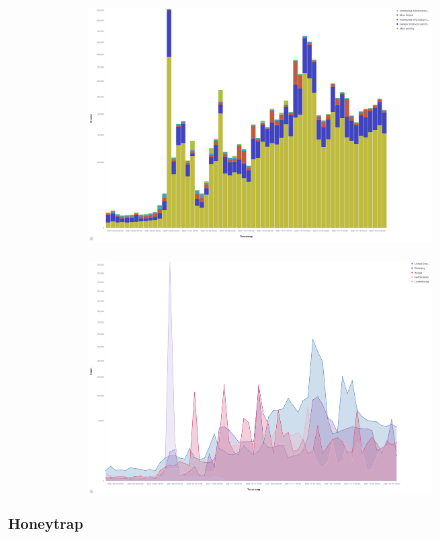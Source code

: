 \begin{figure}
    \centering
   
    \begin{subfigure}[b]{0.49\textwidth}
        \centering
        \includegraphics[width=\textwidth]{figures/tpot-suricata-attacks.png}
        \caption{}
        \label{fig:tpot-suricata-attacks}
    \end{subfigure}
    \hfill
    \begin{subfigure}[b]{0.49\textwidth}
        \centering
        \includegraphics[width=\textwidth]{figures/tpot-suricata-country.png}
        \caption{}
        \label{fig:tpot-suricata-country}
    \end{subfigure}
    \caption[]{}
    \label{fig:attacks}
\end{figure}

\textbf{Honeytrap} 

